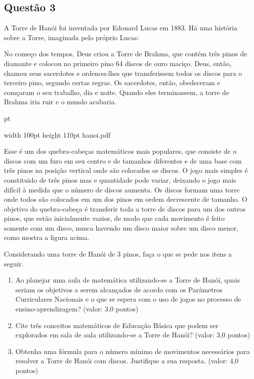 \documentclass{report}
\begin{document}
\subsection{\color{blue} Quest\~ao 3}

A Torre de Han\'oi foi inventada por Edouard Lucas em 1883. H\'a uma hist\'oria sobre a Torre, imaginada pelo pr\'oprio Lucas:

No come\c co dos tempos, Deus criou a Torre de Brahma, que cont\'em tr\^es pinos de diamante e colocou no primeiro pino 64 discos de ouro maci\c co. Deus, ent\~ao, chamou seus sacerdotes e ordenou-lhes que transferissem todos os discos para o terceiro pino, segundo certas regras. Os sacerdotes, ent\~ao, obedeceram e com\c caram o seu trabalho, dia e noite. Quando eles terminassem, a torre de Brahma iria ruir e o mundo acabaria.

 pt

\pdfximage width 100pt height 110pt {hanoi.pdf}

\centerline{\pdfrefximage\pdflastximage}

Esse \'e um dos quebra-cabe\c cas matem\'aticos mais populares, que consiste de $n$ discos com um furo em seu centro e de tamanhos diferentes e de uma base com tr\^es pinos na posi\c c\~ao vertical onde s\~ao colocados os discos. O jogo mais simples \'e constituido de tr\^es pinos mas e quantidade pode variar, deixando o jogo mais dif\'icil \`a medida que o n\'umero de discos aumenta. Os discos formam uma torre onde todos s\~ao colocados em um dos pinos em ordem decrescente de tamanho. O objetivo do quebra-cabe\c ca \'e transferir toda a torre de discos para um dos outros pinos, que est\~ao inicialmente vazios, de modo que cada movimento \'e feito somente com um disco, nunca havendo um disco maior sobre um disco menor, como mostra a figura acima.

Considerando uma torre de Han\'oi de 3 pinos, fa\c ca o que se pede nos itens a seguir.

\begin{enumerate}

\item[(a)] Ao planejar uma aula de matem\'atica utilizando-se a Torre de Han\'oi, quais seriam os objetivos a serem alcan\c cados de acordo com os Par\^ametros Curriculares Nacionais e o que se espera com o uso de jogos no processo de ensino-aprendizagem? (valor: 3,0 pontos)

\item[(b)] Cite tr\^es conceitos matem\'aticos de Educa\c c\~ao B\'asica que podem ser explorados em sala de aula utilizando-se a Torre de Han\'oi? (valor: 3,0 pontos)

\item[(c)] Obtenha uma f\'ormula para o n\'umero m\'inimo de movimentos necess\'arios para resolver a Torre de Han\'oi com discos. Justifique a sua resposta. (valor: 4,0 pontos)

\end{enumerate}
\end{document}
